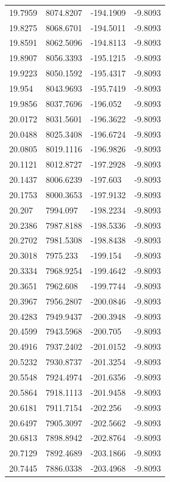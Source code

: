 \begin{table}[H]
\begin{tabular}{llll}
19.7959 & 8074.8207 & -194.1909 & -9.8093 \\
19.8275 & 8068.6701 & -194.5011 & -9.8093 \\
19.8591 & 8062.5096 & -194.8113 & -9.8093 \\
19.8907 & 8056.3393 & -195.1215 & -9.8093 \\
19.9223 & 8050.1592 & -195.4317 & -9.8093 \\
19.954 & 8043.9693 & -195.7419 & -9.8093 \\
19.9856 & 8037.7696 & -196.052 & -9.8093 \\
20.0172 & 8031.5601 & -196.3622 & -9.8093 \\
20.0488 & 8025.3408 & -196.6724 & -9.8093 \\
20.0805 & 8019.1116 & -196.9826 & -9.8093 \\
20.1121 & 8012.8727 & -197.2928 & -9.8093 \\
20.1437 & 8006.6239 & -197.603 & -9.8093 \\
20.1753 & 8000.3653 & -197.9132 & -9.8093 \\
20.207 & 7994.097 & -198.2234 & -9.8093 \\
20.2386 & 7987.8188 & -198.5336 & -9.8093 \\
20.2702 & 7981.5308 & -198.8438 & -9.8093 \\
20.3018 & 7975.233 & -199.154 & -9.8093 \\
20.3334 & 7968.9254 & -199.4642 & -9.8093 \\
20.3651 & 7962.608 & -199.7744 & -9.8093 \\
20.3967 & 7956.2807 & -200.0846 & -9.8093 \\
20.4283 & 7949.9437 & -200.3948 & -9.8093 \\
20.4599 & 7943.5968 & -200.705 & -9.8093 \\
20.4916 & 7937.2402 & -201.0152 & -9.8093 \\
20.5232 & 7930.8737 & -201.3254 & -9.8093 \\
20.5548 & 7924.4974 & -201.6356 & -9.8093 \\
20.5864 & 7918.1113 & -201.9458 & -9.8093 \\
20.6181 & 7911.7154 & -202.256 & -9.8093 \\
20.6497 & 7905.3097 & -202.5662 & -9.8093 \\
20.6813 & 7898.8942 & -202.8764 & -9.8093 \\
20.7129 & 7892.4689 & -203.1866 & -9.8093 \\
20.7445 & 7886.0338 & -203.4968 & -9.8093 \\

\end{tabular}
\end{table}
